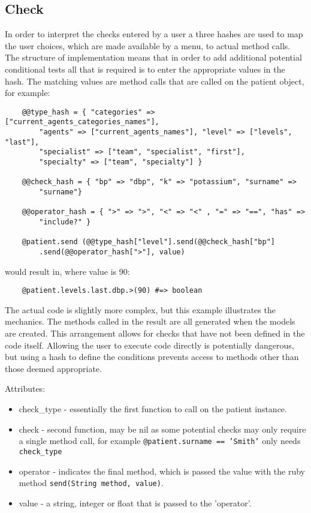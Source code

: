 \documentclass[letterpaper]{amsart}
\begin{document}
\subsection{Check}
In order to interpret the checks entered by a user a three hashes are used to map the user choices, which are made available by a menu, to actual method calls.  The structure of implementation means that in order to add additional potential conditional tests all that is required is to enter the appropriate values in the hash.  The matching values are method calls that are called on the patient object, for example:\\
\begin{verbatim}
    @@type_hash = { "categories" => ["current_agents_categories_names"], 
	    "agents" => ["current_agents_names"], "level" => ["levels", "last"], 
	    "specialist" => ["team", "specialist", "first"], 
	    "specialty" => ["team", "specialty"] }  

    @@check_hash = { "bp" => "dbp", "k" => "potassium", "surname" => 
	    "surname"}

    @@operator_hash = { ">" => ">", "<" => "<" , "=" => "==", "has" => 
	    "include?" }

    @patient.send (@@type_hash["level"].send(@@check_hash["bp"]
	    .send(@@operator_hash[">"], value)

\end{verbatim}
would result in, where value is 90:\\
\begin{verbatim}
    @patient.levels.last.dbp.>(90) #=> boolean

\end{verbatim}
The actual code is slightly more complex, but this example illustrates the mechanics.  The methods called in the result are all generated when the models are created.  This arrangement allows for checks that have not been defined in the code itself.  Allowing the user to execute code directly is potentially dangerous, but using a hash to define the conditions prevents access to methods other than those deemed appropriate.

Attributes:
\begin{itemize}
    \item check\_type - essentially the first function to call on the patient instance.
    \item check - second function, may be nil as some potential checks may only require a single method call, for example \texttt{@patient.surname == 'Smith'} only needs \texttt{check\_type}
    \item operator - indicates the final method, which is passed the value with the ruby method \texttt{send(String method, value)}.
    \item value - a string, integer or float that is passed to the 'operator'.
\end{itemize}
\end{document}
